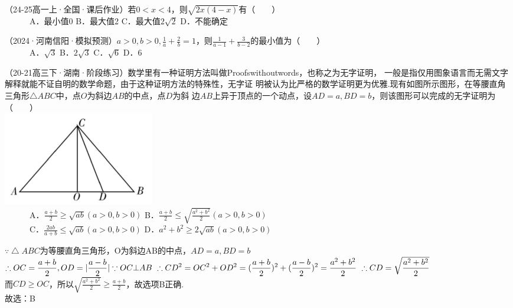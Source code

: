 \documentclass[11pt,a4paper]{ctexbook}
\begin{document}
\begin{hmwk}
    （24-25高一上·全国·课后作业）若$0<x<4$，则$\sqrt{2x(4-x)}$有（    ）\\
          A．最小值0 \quad\quad	B．最大值2 \quad\quad	C．最大值$2\sqrt{2}$ \quad\quad	D．不能确定
\end{hmwk}

\begin{hmwk}
    （2024·河南信阳·模拟预测）$\displaystyle a>0,b>0,\frac{1}{a}+\frac{2}{b}=1$，则$\displaystyle \frac{1}{a-1}+\frac{3}{b-2}$的最小值为（    ）\\
          A．$\sqrt{3}$ \quad\quad	B．$2\sqrt{3}$ \quad\quad	C．$\sqrt{6}$ \quad\quad	D．6
\end{hmwk}

\begin{hmwk}
    （20-21高三下·湖南·阶段练习）数学里有一种证明方法叫做Proofswithoutwords，也称之为无字证明，
    一般是指仅用图象语言而无需文字解释就能不证自明的数学命题，由于这种证明方法的特殊性，无字证
    明被认为比严格的数学证明更为优雅.现有如图所示图形，在等腰直角三角形$\bigtriangleup ABC$中，点$O$为斜边$AB$的中点，点$D$为斜
    边$AB$上异于顶点的一个动点，设$AD=a,BD=b$，则该图形可以完成的无字证明为（    ）\\
    \includegraphics[scale=1.0]{pictures/image3.png}\\
          A．$\displaystyle \frac{a+b}{2}\ge \sqrt{ab}(a>0,b>0)$ \quad\quad	B．$\displaystyle \frac{a+b}{2}\le \sqrt{\frac{a^2+b^2}{2}}(a>0,b>0)$ \quad\quad\\	
          C．$\displaystyle \frac{2ab}{a+b}\le \sqrt{ab}(a>0,b>0)$ \quad\quad	D．$\displaystyle a^2+b^2\ge 2\sqrt{ab}(a>0,b>0)$
    \begin{jiexi}
        $\because \bigtriangleup ABC$为等腰直角三角形，O为斜边AB的中点，$AD=a,BD=b$\\
        $\displaystyle\therefore OC=\frac{a+b}{2},OD=|\frac{a-b}{2}|\\
        \because OC\bot AB \ \therefore CD^2=OC^2+OD^2=(\frac{a+b}{2})^2+(\frac{a-b}{2})^2=\frac{a^2+b^2}{2}\ \therefore CD=\sqrt{\frac{a^2+b^2}{2}}$\\
        而$CD\ge OC$，所以$\displaystyle \sqrt{\frac{a^2+b^2}{2}}\ge\frac{a+b}{2}$，故选项B正确.\\
        故选：B
    \end{jiexi}
\end{hmwk}
\end{document}
